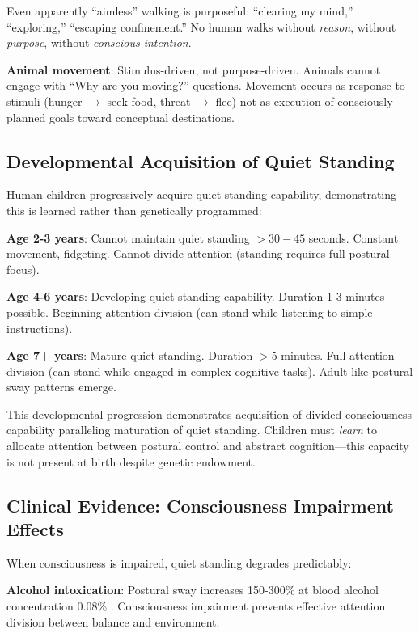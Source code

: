 Even apparently ``aimless'' walking is purposeful: ``clearing my mind,'' ``exploring,'' ``escaping confinement.'' No human walks without \textit{reason}, without \textit{purpose}, without \textit{conscious intention}.

\textbf{Animal movement}: Stimulus-driven, not purpose-driven. Animals cannot engage with ``Why are you moving?'' questions. Movement occurs as response to stimuli (hunger $\rightarrow$ seek food, threat $\rightarrow$ flee) not as execution of consciously-planned goals toward conceptual destinations.

\subsection{Developmental Acquisition of Quiet Standing}

Human children progressively acquire quiet standing capability, demonstrating this is learned rather than genetically programmed:

\textbf{Age 2-3 years}: Cannot maintain quiet standing $>30-45$ seconds. Constant movement, fidgeting. Cannot divide attention (standing requires full postural focus).

\textbf{Age 4-6 years}: Developing quiet standing capability. Duration 1-3 minutes possible. Beginning attention division (can stand while listening to simple instructions).

\textbf{Age 7+ years}: Mature quiet standing. Duration $>5$ minutes. Full attention division (can stand while engaged in complex cognitive tasks). Adult-like postural sway patterns emerge.

This developmental progression demonstrates acquisition of divided consciousness capability paralleling maturation of quiet standing. Children must \textit{learn} to allocate attention between postural control and abstract cognition—this capacity is not present at birth despite genetic endowment.

\subsection{Clinical Evidence: Consciousness Impairment Effects}

When consciousness is impaired, quiet standing degrades predictably:

\textbf{Alcohol intoxication}: Postural sway increases 150-300\% at blood alcohol concentration 0.08\% \citep{deviterne1998alcohol}. Consciousness impairment prevents effective attention division between balance and environment.

